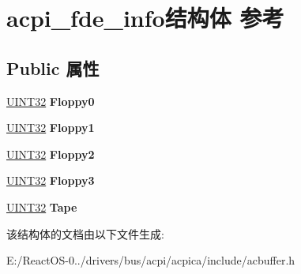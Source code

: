 \hypertarget{structacpi__fde__info}{}\section{acpi\+\_\+fde\+\_\+info结构体 参考}
\label{structacpi__fde__info}
\subsection*{Public 属性}
\begin{DoxyCompactItemize}
\item 
\mbox{\label{structacpi__fde__info_abab2be0e48543740a80d86623bbc0b89}} 
\hyperlink{_processor_bind_8h_ae1e6edbbc26d6fbc71a90190d0266018}{U\+I\+N\+T32} {\bfseries Floppy0}
\item 
\mbox{\label{structacpi__fde__info_a2cee2d17549e4c030013b4c8a9b13b63}} 
\hyperlink{_processor_bind_8h_ae1e6edbbc26d6fbc71a90190d0266018}{U\+I\+N\+T32} {\bfseries Floppy1}
\item 
\mbox{\label{structacpi__fde__info_ae28e6274ceabd3f5f126ef075c822fd2}} 
\hyperlink{_processor_bind_8h_ae1e6edbbc26d6fbc71a90190d0266018}{U\+I\+N\+T32} {\bfseries Floppy2}
\item 
\mbox{\label{structacpi__fde__info_abe9c9dc2fc2c071d7a091062efd5f2d1}} 
\hyperlink{_processor_bind_8h_ae1e6edbbc26d6fbc71a90190d0266018}{U\+I\+N\+T32} {\bfseries Floppy3}
\item 
\mbox{\label{structacpi__fde__info_aac30d15f4373dedb3bf1923c492fa428}} 
\hyperlink{_processor_bind_8h_ae1e6edbbc26d6fbc71a90190d0266018}{U\+I\+N\+T32} {\bfseries Tape}
\end{DoxyCompactItemize}


该结构体的文档由以下文件生成\+:\begin{DoxyCompactItemize}
\item 
E\+:/\+React\+O\+S-\/0../drivers/bus/acpi/acpica/include/acbuffer.\+h\end{DoxyCompactItemize}
